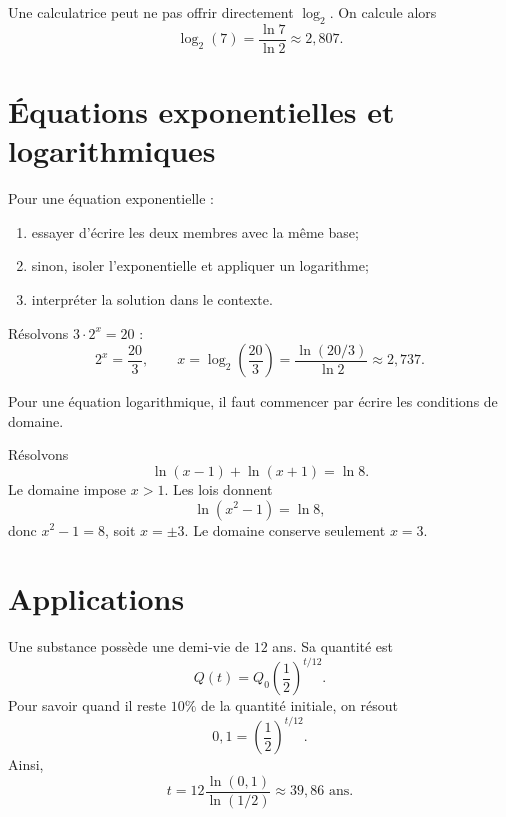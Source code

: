 \begin{examplebox}
Une calculatrice peut ne pas offrir directement $\log_2$. On calcule alors
\[
\log_2(7)=\frac{\ln7}{\ln2}\approx2{,}807.
\]
\end{examplebox}

\section{Équations exponentielles et logarithmiques}
\label{manual:section:06.04}

\begin{methodbox}
Pour une équation exponentielle :
\begin{enumerate}
\item essayer d'écrire les deux membres avec la même base;
\item sinon, isoler l'exponentielle et appliquer un logarithme;
\item interpréter la solution dans le contexte.
\end{enumerate}
\end{methodbox}

\begin{examplebox}
Résolvons $3\cdot2^x=20$ :
\[
2^x=\frac{20}{3},
\qquad
x=\log_2\left(\frac{20}{3}\right)=\frac{\ln(20/3)}{\ln2}\approx2{,}737.
\]
\end{examplebox}

Pour une équation logarithmique, il faut commencer par écrire les conditions de domaine.

\begin{examplebox}
Résolvons
\[
\ln(x-1)+\ln(x+1)=\ln8.
\]
Le domaine impose $x>1$. Les lois donnent
\[
\ln(x^2-1)=\ln8,
\]
donc $x^2-1=8$, soit $x=\pm3$. Le domaine conserve seulement $x=3$.
\end{examplebox}

\section{Applications}
\label{manual:section:06.05}

\begin{examplebox}[title={Exemple : demi-vie}]
Une substance possède une demi-vie de $12$ ans. Sa quantité est
\[
Q(t)=Q_0\left(\frac12\right)^{t/12}.
\]
Pour savoir quand il reste $10\%$ de la quantité initiale, on résout
\[
0{,}1=\left(\frac12\right)^{t/12}.
\]
Ainsi,
\[
t=12\frac{\ln(0{,}1)}{\ln(1/2)}\approx39{,}86\text{ ans}.
\]
\end{examplebox}

